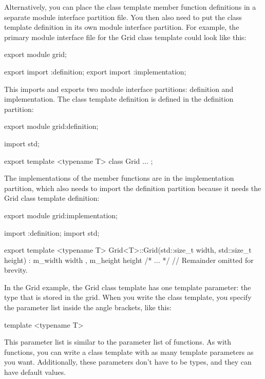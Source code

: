 
Alternatively, you can place the class template member function definitions in a separate module interface partition file. You then also need to put the class template definition in its own module interface partition. For example, the primary module interface file for the Grid class template could look like this:

\begin{cpp}
export module grid;

export import :definition;
export import :implementation;
\end{cpp}

This imports and exports two module interface partitions: definition and implementation. The class template definition is defined in the definition partition:

\begin{cpp}
export module grid:definition;

import std;

export template <typename T> class Grid { ... };
\end{cpp}

The implementations of the member functions are in the implementation partition, which also needs to import the definition partition because it needs the Grid class template definition:

\begin{cpp}
export module grid:implementation;

import :definition;
import std;

export template <typename T>
Grid<T>::Grid(std::size_t width, std::size_t height)
    : m_width { width }, m_height { height }
{ /* ... */ }
// Remainder omitted for brevity.
\end{cpp}


In the Grid example, the Grid class template has one template parameter: the type that is stored in the grid. When you write the class template, you specify the parameter list inside the angle brackets, like this:

\begin{cpp}
template <typename T>
\end{cpp}

This parameter list is similar to the parameter list of functions. As with functions, you can write a class template with as many template parameters as you want. Additionally, these parameters don’t have to be types, and they can have default values.

